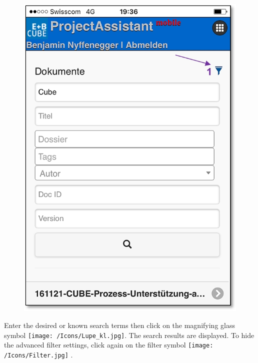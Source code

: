 \begin{figure}   %
  \vspace{-35pt}      %
  \begin{center}
    \includegraphics[width=1\linewidth]{../chapters/11_Dokumentenablage/pictures/11-mob05_Filterverwenden.jpg}
  \end{center}
  \vspace{-20pt}
  \vspace{-10pt}
\end{figure}

Enter the desired or known search terms then click on the magnifying glass symbol \texttt{[image: /Icons/Lupe\_kl.jpg]}. The search results are displayed. To hide the advanced filter settings, click again on the filter symbol \texttt{[image: /Icons/Filter.jpg]} .

